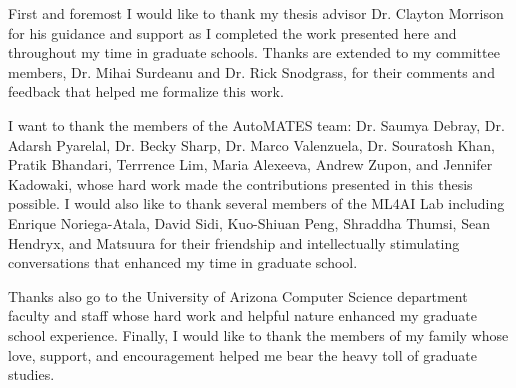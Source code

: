 First and foremost I would like to thank my thesis advisor Dr. Clayton Morrison for his guidance and support as I completed the work presented here and throughout my time in graduate schools.
Thanks are extended to my committee members, Dr. Mihai Surdeanu and Dr. Rick Snodgrass, for their comments and feedback that helped me formalize this work.

I want to thank the members of the AutoMATES team: Dr. Saumya Debray, Dr. Adarsh Pyarelal, Dr. Becky Sharp, Dr. Marco Valenzuela, Dr. Souratosh Khan, Pratik Bhandari, Terrrence Lim, Maria Alexeeva, Andrew Zupon, and Jennifer Kadowaki, whose hard work made the contributions presented in this thesis possible.
I would also like to thank several members of the ML4AI Lab including Enrique Noriega-Atala, David Sidi, Kuo-Shiuan Peng, Shraddha Thumsi, Sean Hendryx, and Matsuura for their friendship and intellectually stimulating conversations that enhanced my time in graduate school.

Thanks also go to the University of Arizona Computer Science department faculty and staff whose hard work and helpful nature enhanced my graduate school experience.
Finally, I would like to thank the members of my family whose love, support, and encouragement helped me bear the heavy toll of graduate studies.

